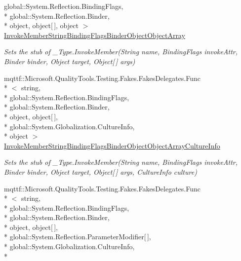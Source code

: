 \begin{DoxyCompactItemize}
global\-::\-System.\-Reflection.\-Binding\-Flags, \\*
global\-::\-System.\-Reflection.\-Binder, \\*
object, object\mbox{[}$\,$\mbox{]}, object $>$ \hyperlink{class_system_1_1_runtime_1_1_interop_services_1_1_fakes_1_1_stub___type_a9efe8e67fb7523819d6a81a3bcb59d6c}{Invoke\-Member\-String\-Binding\-Flags\-Binder\-Object\-Object\-Array}
\begin{DoxyCompactList}\small\item\em Sets the stub of \-\_\-\-Type.\-Invoke\-Member(\-String name, Binding\-Flags invoke\-Attr, Binder binder, Object target, Object\mbox{[}$\,$\mbox{]} args)\end{DoxyCompactList}\item 
mqttf\-::\-Microsoft.\-Quality\-Tools.\-Testing.\-Fakes.\-Fakes\-Delegates.\-Func\\*
$<$ string, \\*
global\-::\-System.\-Reflection.\-Binding\-Flags, \\*
global\-::\-System.\-Reflection.\-Binder, \\*
object, object\mbox{[}$\,$\mbox{]}, \\*
global\-::\-System.\-Globalization.\-Culture\-Info, \\*
object $>$ \hyperlink{class_system_1_1_runtime_1_1_interop_services_1_1_fakes_1_1_stub___type_a07c3c157fd6220015a4152ec83316c86}{Invoke\-Member\-String\-Binding\-Flags\-Binder\-Object\-Object\-Array\-Culture\-Info}
\begin{DoxyCompactList}\small\item\em Sets the stub of \-\_\-\-Type.\-Invoke\-Member(\-String name, Binding\-Flags invoke\-Attr, Binder binder, Object target, Object\mbox{[}$\,$\mbox{]} args, Culture\-Info culture)\end{DoxyCompactList}\item 
mqttf\-::\-Microsoft.\-Quality\-Tools.\-Testing.\-Fakes.\-Fakes\-Delegates.\-Func\\*
$<$ string, \\*
global\-::\-System.\-Reflection.\-Binding\-Flags, \\*
global\-::\-System.\-Reflection.\-Binder, \\*
object, object\mbox{[}$\,$\mbox{]}, \\*
global\-::\-System.\-Reflection.\-Parameter\-Modifier\mbox{[}$\,$\mbox{]}, \\*
global\-::\-System.\-Globalization.\-Culture\-Info, \\*

\end{DoxyCompactItemize}
